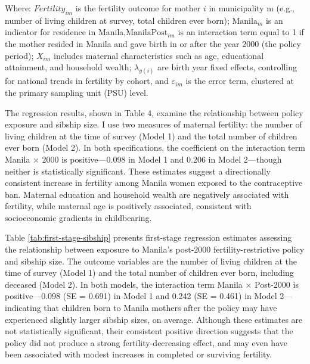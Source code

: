 \documentclass[]{AEA}
\begin{document}
Where: \(Fertility_{im}\) is the fertility outcome for mother \(i\) in
municipality m (e.g., number of living children at survey, total
children ever born); \(\text{Manila}_m\) is an indicator for residence
in Manila,\(\text{ManilaPost}_{im}\) is an interaction term equal to 1
if the mother resided in Manila and gave birth in or after the year 2000
(the policy period); \(X_{im}\) includes maternal characteristics such
as age, educational attainment, and household wealth; \(\lambda_{y(i)}\)
are birth year fixed effects, controlling for national trends in
fertility by cohort, and \(\varepsilon_{im}\) is the error term,
clustered at the primary sampling unit (PSU) level.

The regression results, shown in Table 4, examine the relationship
between policy exposure and sibship size. I use two measures of maternal
fertility: the number of living children at the time of survey (Model 1)
and the total number of children ever born (Model 2). In both
specifications, the coefficient on the interaction term Manila × 2000 is
positive---0.098 in Model 1 and 0.206 in Model 2---though neither is
statistically significant. These estimates suggest a directionally
consistent increase in fertility among Manila women exposed to the
contraceptive ban. Maternal education and household wealth are
negatively associated with fertility, while maternal age is positively
associated, consistent with socioeconomic gradients in childbearing.

Table \ref{tab:first-stage-sibship} presents first-stage regression
estimates assessing the relationship between exposure to Manila's
post-2000 fertility-restrictive policy and sibship size. The outcome
variables are the number of living children at the time of survey (Model
1) and the total number of children ever born, including deceased (Model
2). In both models, the interaction term Manila × Post-2000 is
positive---0.098 (SE = 0.691) in Model 1 and 0.242 (SE = 0.461) in Model
2---indicating that children born to Manila mothers after the policy may
have experienced slightly larger sibship sizes, on average. Although
these estimates are not statistically significant, their consistent
positive direction suggests that the policy did not produce a strong
fertility-decreasing effect, and may even have been associated with
modest increases in completed or surviving fertility.
\end{document}
